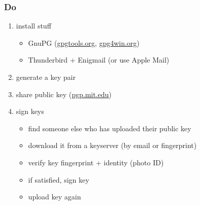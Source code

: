 \documentclass{beamer}
\begin{document}
\begin{frame}
  \frametitle{Do}

  \begin{enumerate}
    \item install stuff
      \begin{itemize}
        \item GnuPG (\url{gpgtools.org}, \url{gpg4win.org})
        \item Thunderbird + Enigmail (or use Apple Mail)
      \end{itemize}
    \item generate a key pair
    \item share public key (\url{pgp.mit.edu})
    \item sign keys
      \begin{itemize}
        \item find someone else who has uploaded their public key
        \item download it from a keyserver (by email or fingerprint)
        \item verify key fingerprint + identity (photo ID)
        \item if satisfied, sign key
        \item upload key again
      \end{itemize}
  \end{enumerate}

\end{frame}
\end{document}
